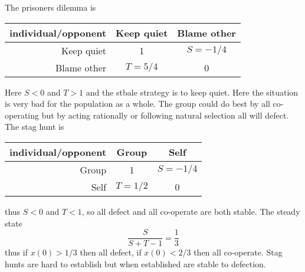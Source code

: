 The prisoners dilemma is

\begin{tabular}{r|cc}
individual/opponent & Keep quiet & Blame other \\
\hline
Keep quiet  & 1 & $S=-1/4$ \\
Blame other & $T=5/4$ & 0 
\end{tabular}

Here $S<0$ and $T>1$ and the stbale strategy is to keep quiet. Here
the situation is very bad for the population as a whole. The group
could do best by all co-operating but by acting rationally or
following natural selection all will defect.\\

The stag hunt is

\begin{tabular}{r|cc}
individual/opponent & Group & Self \\
\hline
Group & 1 & $S=-1/4$ \\
Self & $T=1/2$ & 0 
\end{tabular}

thus $S<0$ and $T<1$, so all defect and all co-operate are both
stable. The steady state
\[
\frac{S}{S+T-1} = \frac{1}{3}
\]
thus if $x(0)>1/3$ then all defect, if $x(0)<2/3$ then all
co-operate. Stag hunts are hard to establish but when established are
stable to defection.
